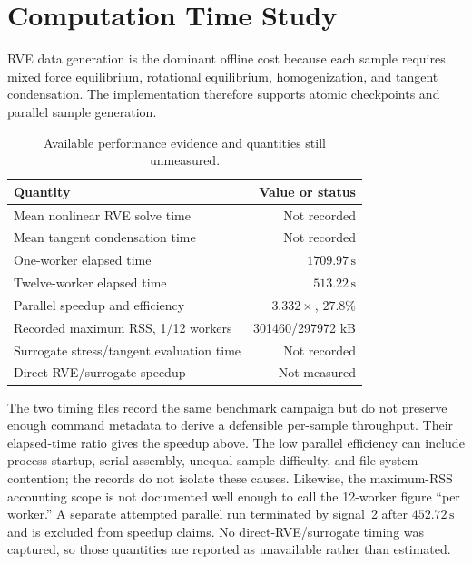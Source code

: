 \chapter{Computation Time Study}
\label{ch:performance}

RVE data generation is the dominant offline cost because each sample requires
mixed force equilibrium, rotational equilibrium, homogenization, and tangent
condensation. The implementation therefore supports atomic checkpoints and
parallel sample generation.

\begin{table}[H]
\centering
\caption{Available performance evidence and quantities still unmeasured.}
\label{tab:performance}
\begin{tabularx}{\textwidth}{@{}Xr@{}}
\toprule
Quantity & Value or status\\
\midrule
Mean nonlinear RVE solve time & Not recorded\\
Mean tangent condensation time & Not recorded\\
One-worker elapsed time & \(1709.97\,\mathrm{s}\)\\
Twelve-worker elapsed time & \(513.22\,\mathrm{s}\)\\
Parallel speedup and efficiency & \(3.332\times\), \(27.8\%\)\\
Recorded maximum RSS, 1/12 workers & 301460/297972 kB\\
Surrogate stress/tangent evaluation time & Not recorded\\
Direct-RVE/surrogate speedup & Not measured\\
\bottomrule
\end{tabularx}
\end{table}

The two timing files record the same benchmark campaign but do not preserve
enough command metadata to derive a defensible per-sample throughput. Their
elapsed-time ratio gives the speedup above. The low parallel efficiency can
include process startup, serial assembly, unequal sample difficulty, and
file-system contention; the records do not isolate these causes. Likewise,
the maximum-RSS accounting scope is not documented well enough to call the
12-worker figure ``per worker.'' A separate attempted parallel run terminated
by signal~2 after \(452.72\,\mathrm{s}\) and is excluded from speedup claims.
No direct-RVE/surrogate timing was captured, so those quantities are reported
as unavailable rather than estimated.
